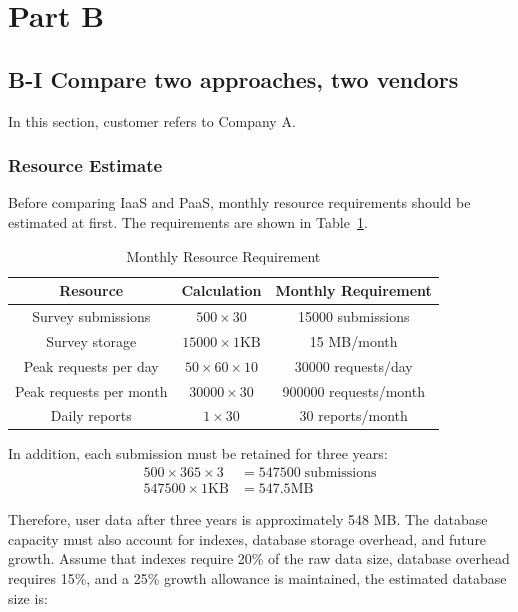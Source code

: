 \section{Part B}

\subsection{B-I Compare two approaches, two vendors}

In this section, customer refers to Company A.

\subsubsection{Resource Estimate}

Before comparing IaaS and PaaS, monthly resource requirements should be estimated at first. The requirements are shown in Table~\ref{tab:monthly-resource-requirement}.

\begin{table}[H]
	\centering
	\caption{Monthly Resource Requirement}
	\label{tab:monthly-resource-requirement}
	\begin{tabular}{|c|c|c|}
		\hline
		Resource                & Calculation                  & Monthly Requirement   \\
		\hline
		Survey submissions      & \(500 \times 30\)            & 15000 submissions     \\
		\hline
		Survey storage          & \(15000 \times 1 \text{KB}\) & 15 MB/month           \\
		\hline
		Peak requests per day   & \(50 \times 60 \times 10\)   & 30000 requests/day    \\
		\hline
		Peak requests per month & \(30000 \times 30\)          & 900000 requests/month \\
		\hline
		Daily reports           & \(1 \times 30\)              & 30 reports/month      \\
		\hline
	\end{tabular}
\end{table}

In addition, each submission must be retained for three years:
\begin{align*}
	500 \times 365 \times 3   & = 547500 \; \text{submissions} \\
	547500 \times 1 \text{KB} & = 547.5 \text{MB}
\end{align*}

Therefore, user data after three years is approximately 548 MB. The database capacity must also account for indexes, database storage overhead, and future growth. Assume that indexes require 20\% of the raw data size, database overhead requires 15\%, and a 25\% growth allowance is maintained, the estimated database size is:

